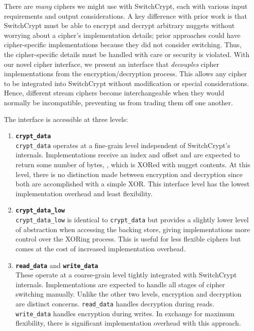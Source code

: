 There are \emph{many} ciphers we might use with SwitchCrypt, each with various
input requirements and output considerations. A key difference with prior work
is that SwitchCrypt must be able to encrypt and decrypt arbitrary nuggets
without worrying about a cipher's implementation details; prior approaches could
have cipher-specific implementations because they did not consider switching.
Thus, the cipher-specific details must be handled with care or security is
violated. With our novel cipher interface, we present an interface that
\emph{decouples} cipher implementations from the encryption/decryption process.
This allows any cipher to be integrated into SwitchCrypt without modification or
special considerations. Hence, different stream ciphers become interchangeable
when they would normally be incompatible, preventing us from trading them off
one another.

The interface is accessible at three levels:

\begin{enumerate}
   \item \textbf{\texttt{crypt\_data}}\\\texttt{crypt\_data} operates at a
   fine-grain level independent of SwitchCrypt's internals. Implementations
   receive an index and offset and are expected to return some number of bytes,
   , which is XORed with nugget contents. At this level, there
   is no distinction made between encryption and decryption since both are
   accomplished with a simple XOR. This interface level has the lowest
   implementation overhead and least flexibility.

   \item \textbf{\texttt{crypt\_data\_low}}\\\texttt{crypt\_data\_low}
   is identical to \texttt{crypt\_data} but provides a slightly lower level of
   abstraction when accessing the backing store, giving implementations more
   control over the XORing process. This is useful for less flexible ciphers but
   comes at the cost of increased implementation overhead.

   \item \textbf{\texttt{read\_data}} and \textbf{\texttt{write\_data}}\\
   These operate at a coarse-grain level tightly integrated with SwitchCrypt
   internals. Implementations are expected to handle all stages of cipher
   switching manually. Unlike the other two levels, encryption and decryption
   are distinct concerns. \texttt{read\_data} handles decryption during reads.
   \texttt{write\_data} handles encryption during writes. In exchange for
   maximum flexibility, there is significant implementation overhead with this
   approach.
\end{enumerate}

